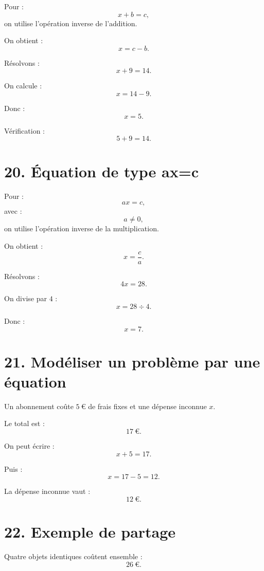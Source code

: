 Pour :
\[
x+b=c,
\]
on utilise l'opération inverse de l'addition.

On obtient :
\[
x=c-b.
\]

\begin{exemple}
Résolvons :
\[
x+9=14.
\]

On calcule :
\[
x=14-9.
\]

Donc :
\[
\boxed{x=5}.
\]

Vérification :
\[
5+9=14.
\]
\end{exemple}

\section{20. Équation de type ax=c}

Pour :
\[
ax=c,
\]
avec :
\[
a\neq0,
\]
on utilise l'opération inverse de la multiplication.

On obtient :
\[
x=\dfrac ca.
\]


\begin{exemple}
Résolvons :
\[
4x=28.
\]

On divise par $4$ :
\[
x=28\div4.
\]

Donc :
\[
\boxed{x=7}.
\]
\end{exemple}

\section{21. Modéliser un problème par une équation}

Un abonnement coûte $5\ \text{€}$ de frais fixes et une dépense inconnue $x$.

Le total est :
\[
17\ \text{€}.
\]

On peut écrire :
\[
x+5=17.
\]

Puis :
\[
x=17-5=12.
\]

La dépense inconnue vaut :
\[
\boxed{12\ \text{€}}.
\]

\section{22. Exemple de partage}

Quatre objets identiques coûtent ensemble :
\[
26\ \text{€}.
\]

